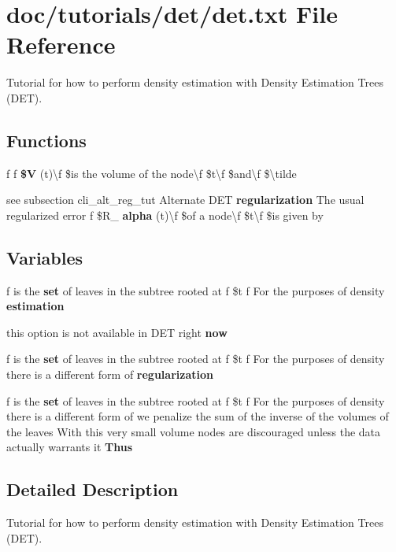 \section{doc/tutorials/det/det.txt File Reference}
\label{det_8txt}


Tutorial for how to perform density estimation with Density Estimation Trees (D\+ET).  


\subsection*{Functions}
\begin{DoxyCompactItemize}
\item 
f f {\bf \$V} (t)\textbackslash{}f \$is the volume of the node\textbackslash{}f \$t\textbackslash{}f \$and\textbackslash{}f \$\textbackslash{}tilde
\item 
see subsection cli\+\_\+alt\+\_\+reg\+\_\+tut Alternate D\+ET {\bf regularization} The usual regularized error f \$R\+\_\+ {\bf alpha} (t)\textbackslash{}f \$of a node\textbackslash{}f \$t\textbackslash{}f \$is given by
\end{DoxyCompactItemize}
\subsection*{Variables}
\begin{DoxyCompactItemize}
\item 
f is the {\bf set} of leaves in the subtree rooted at f \$t f For the purposes of density {\bf estimation}
\item 
this option is not available in D\+ET right {\bf now}
\item 
f is the {\bf set} of leaves in the subtree rooted at f \$t f For the purposes of density there is a different form of {\bf regularization}
\item 
f is the {\bf set} of leaves in the subtree rooted at f \$t f For the purposes of density there is a different form of we penalize the sum of the inverse of the volumes of the leaves With this very small volume nodes are discouraged unless the data actually warrants it {\bf Thus}
\end{DoxyCompactItemize}


\subsection{Detailed Description}
Tutorial for how to perform density estimation with Density Estimation Trees (D\+ET). 

